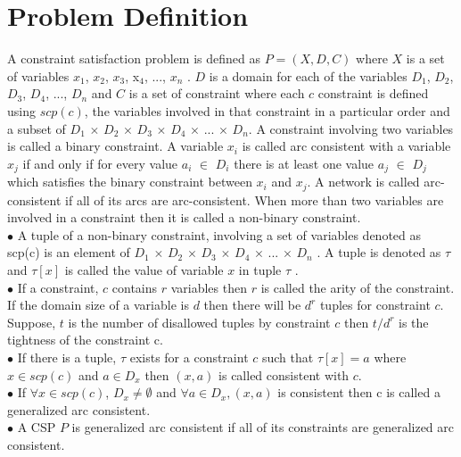 \documentclass[11pt , conference]{IEEEtran}
\begin{document}
\section{Problem Definition}
\noindent A constraint satisfaction problem is defined as $ P = (X, D, C) $ where $ X $ is a set of variables {$x _{1} $, $x _{2} $, $x _{3} $, x$ _{4} $, ..., $x _{n} $} . $ D $ is a domain for each of the variables {$D _{1} $, $D _{2} $, $D _{3} $, $D _{4} $, ..., $D _{n} $} and $C$ is a set of constraint where each $ c $ constraint is defined using $ scp(c) $, the variables involved in that constraint  in a particular order and a subset of $D _{1} $ $\times$ $D _{2} $ $\times$ $D _{3} $ $\times$ $D _{4} $ $\times$ ... $\times$ $D _{n} $.  A constraint involving two variables is called a binary constraint. A variable $x _{i} $ is called arc consistent with a variable $ x_{j} $ if and only if for every value $ a_{i} $ $\in$ $ D_{i} $ there is at least one value $ a_{j} $ $\in$ $ D_{j} $ which satisfies the binary constraint between $ x_{i} $ and $ x_{j} $. A network is called arc-consistent if all of its arcs are arc-consistent. When more than two variables are involved in a constraint then it is called a non-binary constraint.\\
\noindent$\bullet$ A tuple of a non-binary constraint, involving a set of variables denoted as scp(c) is an element of $D _{1} $ $\times$ $D _{2} $ $\times$ $D _{3} $ $\times$ $D _{4} $ $\times$ ... $\times$ $D _{n} $ . A tuple is denoted as $\tau$ and $\tau[x]$ is called the value of variable $ x $ in tuple $\tau$ .\\
\noindent $\bullet$ If a constraint, $ c $ contains $ r $ variables then $ r $ is called the arity of the constraint. If the domain size of a variable is $ d $ then there will be $ d^{r} $ tuples for constraint $ c $. Suppose, $ t $ is the number of disallowed tuples by constraint $ c $ then $t/d^r$ is the tightness of the constraint c.
\\$\bullet$ If there is a tuple, $\tau$ exists for a constraint $ c $ such that $\tau[x] = a$ where $x \in scp(c)$ and $a \in D_{x}$ then $ (x,a) $ is called consistent with $ c $.\\ $\bullet$ If $\forall x \in scp(c)$, $ D_{x} \ne \emptyset $ and $\forall a \in D_{x}, (x,a)$  is consistent then c is called a generalized arc consistent. \\
$\bullet$ A CSP $ P $ is generalized arc consistent if all of its constraints are generalized arc consistent. \\\\
\end{document}
